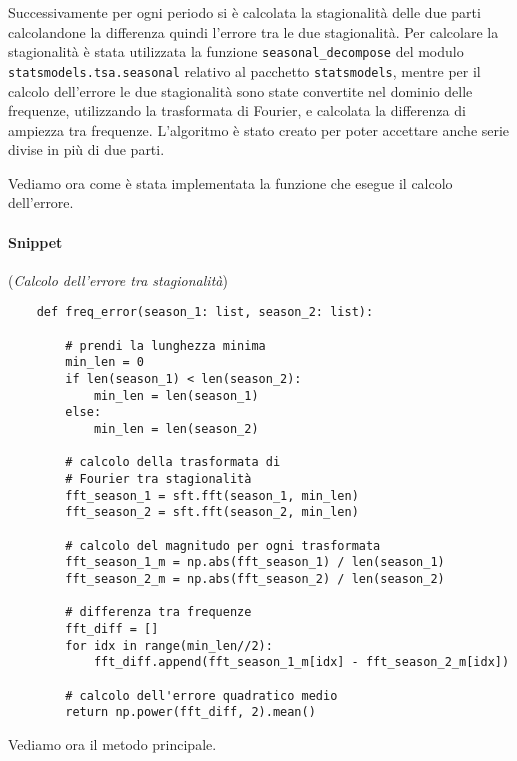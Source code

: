 \begin{sloppypar}
Successivamente per ogni periodo si è calcolata la stagionalità delle due parti
calcolandone la differenza quindi l'errore tra le due stagionalità. Per calcolare la stagionalità
è stata utilizzata la funzione \texttt{seasonal\_decompose} del modulo \texttt{statsmodels.tsa.seasonal}
relativo al pacchetto \texttt{statsmodels}, mentre per il calcolo dell'errore
le due stagionalità sono state convertite nel dominio delle frequenze, utilizzando la trasformata
di Fourier, e calcolata la differenza di ampiezza tra frequenze. L'algoritmo è stato 
creato per poter accettare anche serie divise in più di due parti.
\end{sloppypar}

Vediamo ora come è stata implementata la funzione che esegue il calcolo dell'errore.

\paragraph*{Snippet} (\textit{Calcolo dell'errore tra stagionalità})
\begin{verbatim}
    def freq_error(season_1: list, season_2: list):

        # prendi la lunghezza minima 
        min_len = 0
        if len(season_1) < len(season_2):
            min_len = len(season_1)
        else:
            min_len = len(season_2)

        # calcolo della trasformata di 
        # Fourier tra stagionalità
        fft_season_1 = sft.fft(season_1, min_len)
        fft_season_2 = sft.fft(season_2, min_len)

        # calcolo del magnitudo per ogni trasformata
        fft_season_1_m = np.abs(fft_season_1) / len(season_1)
        fft_season_2_m = np.abs(fft_season_2) / len(season_2)

        # differenza tra frequenze
        fft_diff = []
        for idx in range(min_len//2):
            fft_diff.append(fft_season_1_m[idx] - fft_season_2_m[idx])
        
        # calcolo dell'errore quadratico medio
        return np.power(fft_diff, 2).mean() 
\end{verbatim}


Vediamo ora il metodo principale.
